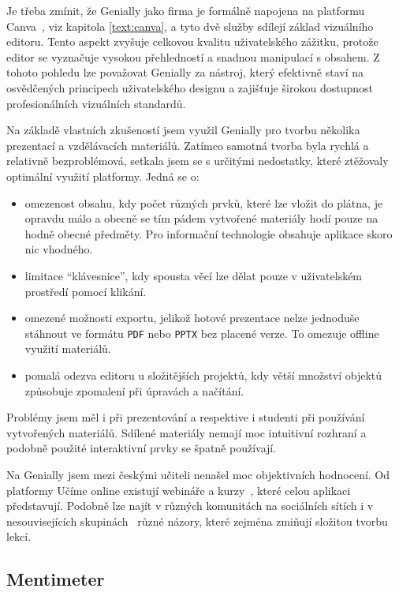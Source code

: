 Je třeba zmínit, že Genially jako firma je formálně napojena na platformu Canva~\cite{genially}, viz kapitola \ref{text:canva}, a tyto dvě služby sdílejí základ vizuálního editoru. 
Tento aspekt zvyšuje celkovou kvalitu uživatelského zážitku, protože editor se vyznačuje vysokou přehledností a snadnou manipulací s obsahem. 
Z tohoto pohledu lze považovat Genially za nástroj, který efektivně staví na osvědčených principech uživatelského designu a zajišťuje širokou dostupnost profesionálních vizuálních standardů.

Na základě vlastních zkušeností jsem využil Genially pro tvorbu několika prezentací a vzdělávacích materiálů. 
Zatímco samotná tvorba byla rychlá a relativně bezproblémová, setkala jsem se s určitými nedostatky, které ztěžovaly optimální využití platformy. 
Jedná se o:

\begin{itemize}
    \item omezenost obsahu, kdy počet různých prvků, které lze vložit do plátna, je opravdu málo a obecně se tím pádem vytvořené materiály hodí pouze na hodně obecné předměty. Pro informační technologie obsahuje aplikace skoro nic vhodného.  
    \item limitace \enquote{klávesnice}, kdy spousta věcí lze dělat pouze v uživatelském prostředí pomocí klikání. 
    \item omezené možnosti exportu, jelikož hotové prezentace nelze jednoduše stáhnout ve formátu \texttt{PDF} nebo \texttt{PPTX} bez placené verze. To omezuje offline využití materiálů.  
    \item pomalá odezva editoru u složitějších projektů, kdy větší množství objektů způsobuje zpomalení při úpravách a načítání.  
\end{itemize}

Problémy jsem měl i při prezentování a respektive i studenti při používání vytvořených materiálů.
Sdílené materiály nemají moc intuitivní rozhraní a podobně použité interaktivní prvky se špatně používají.

Na Genially jsem mezi českými učiteli nenašel moc objektivních hodnocení.
Od platformy Učíme online existují webináře a kurzy~\cite{genially_ucimeonline}, které celou aplikaci představují.
Podobně lze najít v různých komunitách na sociálních sítích i v nesouvisejících skupinách~\cite{canva_facebook} různé názory, které zejména zmiňují složitou tvorbu lekcí.

\subsection{Mentimeter}


